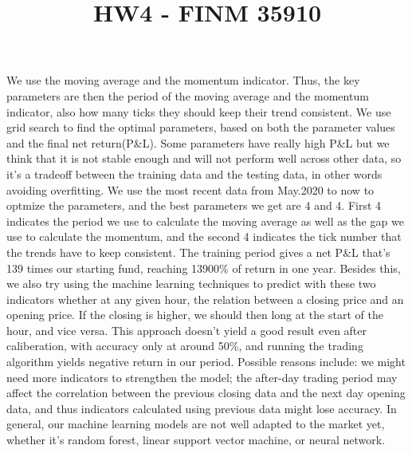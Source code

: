 \documentclass[12pt]{article}
\title{HW4 - FINM 35910}
\author{\vspace{-10ex}}
\date{\vspace{-8ex}}
\begin{document}
\maketitle
\setlength{\parindent}{0pt}
We use the moving average and the momentum indicator. Thus, the key parameters are then
the period of the moving average and the momentum indicator, also how many ticks they should
keep their trend consistent. We use grid search to find the optimal parameters, based on both
the parameter values and the final net return(P\&L). Some parameters have really high P\&L but 
we think that it is not stable enough and will not perform well across other data, so it's a tradeoff
between the training data and the testing data, in other words avoiding overfitting. 
\medbreak
We use the most recent data from May.2020 to now to optmize the parameters, and the best parameters
we get are 4 and 4. First 4 indicates the period we use to calculate the moving average as well
as the gap we use to calculate the momentum, and the second 4 indicates the tick number that the trends
have to keep consistent. The training period gives a net P\&L that's 139 times our starting fund,
reaching 13900\% of return in one year. 
\medbreak
Besides this, we also try using the machine learning techniques to predict with these two
indicators whether at any given hour, the relation between a closing price and an opening price. 
If the closing is higher, we should then long at the start of the hour, and vice versa. 
This approach doesn't yield a good result even after caliberation, with accuracy only at around 50\%, 
and running the trading algorithm yields negative return in our period. Possible reasons include:
we might need more indicators to strengthen the model; the after-day trading period may affect
the correlation between the previous closing data and the next day opening data, and thus indicators 
calculated using previous data might lose accuracy. In general, our machine learning models are not well 
adapted to the market yet, whether it's random forest, linear support vector machine, or neural network. 
\end{document}
